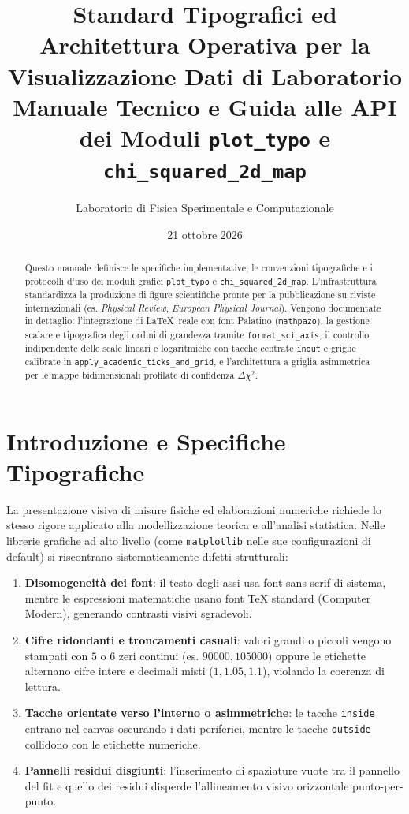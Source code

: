 \documentclass[11pt,a4paper]{article}
\title{\textbf{Standard Tipografici ed Architettura Operativa per la Visualizzazione Dati di Laboratorio}\\\large Manuale Tecnico e Guida alle API dei Moduli \texttt{plot\_typo} e \texttt{chi\_squared\_2d\_map}}
\author{Laboratorio di Fisica Sperimentale e Computazionale}
\date{21 ottobre 2026}
\begin{document}
\maketitle

\begin{abstract}
Questo manuale definisce le specifiche implementative, le convenzioni tipografiche e i protocolli d'uso dei moduli grafici \texttt{plot\_typo} e \texttt{chi\_squared\_2d\_map}. L'infrastruttura standardizza la produzione di figure scientifiche pronte per la pubblicazione su riviste internazionali (es. \emph{Physical Review}, \emph{European Physical Journal}). Vengono documentate in dettaglio: l'integrazione di \LaTeX\ reale con font Palatino (\texttt{mathpazo}), la gestione scalare e tipografica degli ordini di grandezza tramite \texttt{format\_sci\_axis}, il controllo indipendente delle scale lineari e logaritmiche con tacche centrate \texttt{inout} e griglie calibrate in \texttt{apply\_academic\_ticks\_and\_grid}, e l'architettura a griglia asimmetrica per le mappe bidimensionali profilate di confidenza $\Delta\chi^2$.
\end{abstract}

\tableofcontents
\newpage

\section{Introduzione e Specifiche Tipografiche}

La presentazione visiva di misure fisiche ed elaborazioni numeriche richiede lo stesso rigore applicato alla modellizzazione teorica e all'analisi statistica. Nelle librerie grafiche ad alto livello (come \texttt{matplotlib} nelle sue configurazioni di default) si riscontrano sistematicamente difetti strutturali:
\begin{enumerate}
    \item \textbf{Disomogeneità dei font}: il testo degli assi usa font sans-serif di sistema, mentre le espressioni matematiche usano font TeX standard (Computer Modern), generando contrasti visivi sgradevoli.
    \item \textbf{Cifre ridondanti e troncamenti casuali}: valori grandi o piccoli vengono stampati con $5$ o $6$ zeri continui (es. $90000, 105000$) oppure le etichette alternano cifre intere e decimali misti ($1, 1.05, 1.1$), violando la coerenza di lettura.
    \item \textbf{Tacche orientate verso l'interno o asimmetriche}: le tacche \texttt{inside} entrano nel canvas oscurando i dati periferici, mentre le tacche \texttt{outside} collidono con le etichette numeriche.
    \item \textbf{Pannelli residui disgiunti}: l'inserimento di spaziature vuote tra il pannello del fit e quello dei residui disperde l'allineamento visivo orizzontale punto-per-punto.
\end{enumerate}
\end{document}
